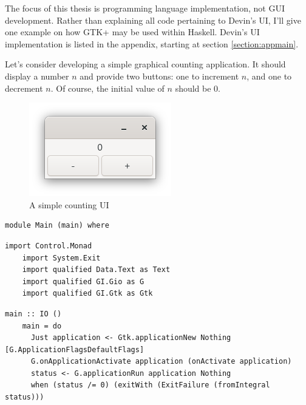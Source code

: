 \documentclass[UdineBachThesis,american,11pt,draft]{PhdThesis}
\begin{document}
  The focus of this thesis is programming language implementation, not GUI
  development. Rather than explaining all code pertaining to Devin's UI, I'll
  give one example on how GTK+ may be used within Haskell. Devin's UI
  implementation is listed in the appendix, starting at section
  \ref{section:appmain}.

  Let's consider developing a simple graphical counting application. It should
  display a number $n$ and provide two buttons: one to increment $n$, and one to
  decrement $n$. Of course, the initial value of $n$ should be $0$.

  \begin{figure}[h]
    \centering
    \includegraphics[scale=0.8]{7.png}
    \caption{A simple counting UI}
  \end{figure}

  \begin{lstlisting}[gobble=4,basicstyle=\ttfamily\small]
    module Main (main) where
  \end{lstlisting}

  \begin{lstlisting}[gobble=4,basicstyle=\ttfamily\small]
    import Control.Monad
    import System.Exit
    import qualified Data.Text as Text
    import qualified GI.Gio as G
    import qualified GI.Gtk as Gtk
  \end{lstlisting}

  \begin{lstlisting}[gobble=4,basicstyle=\ttfamily\small]
    main :: IO ()
    main = do
      Just application <- Gtk.applicationNew Nothing [G.ApplicationFlagsDefaultFlags]
      G.onApplicationActivate application (onActivate application)
      status <- G.applicationRun application Nothing
      when (status /= 0) (exitWith (ExitFailure (fromIntegral status)))
  \end{lstlisting}
\end{document}
